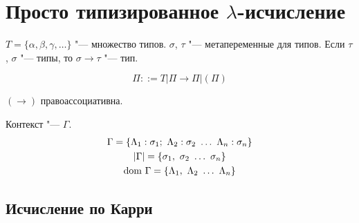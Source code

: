 \section{\texorpdfstring{Просто типизированное $\lambda$-исчисление}{Simply typed lambda calculus}}

\begin{definition}[Тип]
    $T = \{\alpha, \beta, \gamma, \ldots\}$ "--- множество типов.
    $\sigma$, $\tau$ "--- метапеременные для типов.
    Если $\tau$, $\sigma$ "--- типы, то $\sigma \rightarrow \tau$ "--- тип.
    \begin{bnf}
    \[
        \Pi ::= T | \Pi \rightarrow \Pi | (\Pi)
    \]
    \end{bnf}
    $\left(\rightarrow\right)$ правоассоциативна.
\end{definition}

\begin{definition}[Контекст] Контекст "--- $\Gamma$.
\begin{gather*}
    \Gamma = \{ \Lambda_{1} : \sigma_{1};\ \Lambda_{2} : \sigma_{2}\ \ldots\ \Lambda_{n} : \sigma_{n} \} \\
    \abs{\Gamma} = \{ \sigma_{1},\ \sigma_{2}\ \ldots\ \sigma_{n} \} \\
    \mathrm{dom}\ \Gamma = \{ \Lambda_{1},\ \Lambda_{2}\ \ldots\ \Lambda_{n} \}
\end{gather*}
\end{definition}

\subsection{\texorpdfstring{Исчисление по Карри}{Curry-style}}

